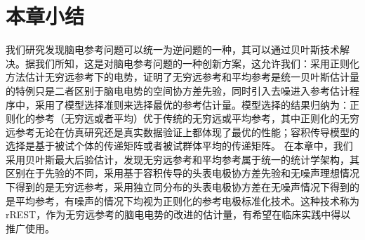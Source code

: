 \section{本章小结}
我们研究发现脑电参考问题可以统一为逆问题的一种，其可以通过贝叶斯技术解决。据我们所知，这是对脑电参考问题的一种创新方案，这允许我们：采用正则化方法估计无穷远参考下的电势，证明了无穷远参考和平均参考是统一贝叶斯估计量的特例只是二者区别于脑电电势的空间协方差先验，同时引入去噪进入参考估计程序中，采用了模型选择准则来选择最优的参考估计量。模型选择的结果归纳为：正则化的参考（无穷远或者平均）优于传统的无穷远或平均参考，其中正则化的无穷远参考无论在仿真研究还是真实数据验证上都体现了最优的性能；容积传导模型的选择是基于被试个体的传递矩阵或者被试群体平均的传递矩阵。
在本章中，我们采用贝叶斯最大后验估计，发现无穷远参考和平均参考属于统一的统计学架构，其区别在于先验的不同，采用基于容积传导的头表电极协方差先验和无噪声理想情况下得到的是无穷远参考，采用独立同分布的头表电极协方差在无噪声情况下得到的是平均参考，有噪声的情况下均视为正则化的参考电极标准化技术。这种技术称为rREST，作为无穷远参考的脑电电势的改进的估计量，有希望在临床实践中得以推广使用。